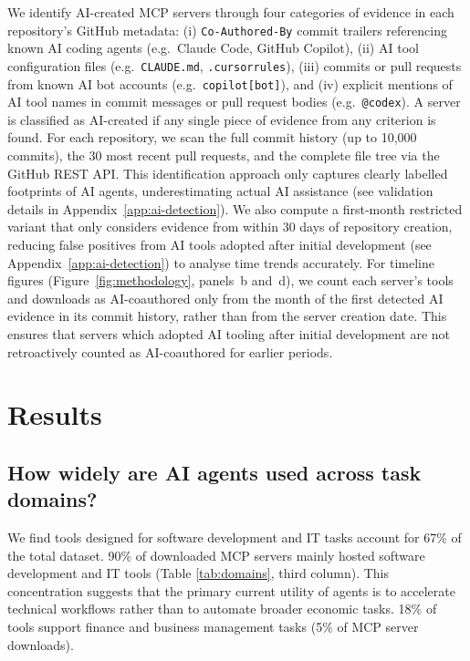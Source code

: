 \documentclass[manuscript,screen,nonacm,oneside]{acmart}
\begin{document}
We identify AI-created MCP servers through four categories of evidence in each repository's GitHub metadata: (i) \texttt{Co-Authored-By} commit trailers referencing known AI coding agents (e.g.\ Claude Code, GitHub Copilot), (ii) AI tool configuration files (e.g.\ \texttt{CLAUDE.md}, \texttt{.cursorrules}), (iii) commits or pull requests from known AI bot accounts (e.g.\ \texttt{copilot[bot]}), and (iv) explicit mentions of AI tool names in commit messages or pull request bodies (e.g.\ \texttt{@codex}). A server is classified as AI-created if any single piece of evidence from any criterion is found. For each repository, we scan the full commit history (up to 10,000 commits), the 30 most recent pull requests, and the complete file tree via the GitHub REST API. This identification approach only captures clearly labelled footprints of AI agents, underestimating actual AI assistance (see validation details in Appendix~\ref{app:ai-detection}). We also compute a first-month restricted variant that only considers evidence from within 30 days of repository creation, reducing false positives from AI tools adopted after initial development (see Appendix~\ref{app:ai-detection}) to analyse time trends accurately. For timeline figures (Figure~\ref{fig:methodology}, panels~b and~d), we count each server's tools and downloads as AI-coauthored only from the month of the first detected AI evidence in its commit history, rather than from the server creation date. This ensures that servers which adopted AI tooling after initial development are not retroactively counted as AI-coauthored for earlier periods.

\section{Results}
\label{sec:results}
\subsection{How widely are AI agents used across task domains?}
\label{sec:res-task-domains}

We find tools designed for software development and IT tasks account for 67\% of the total dataset. 90\% of downloaded MCP servers mainly hosted software development and IT tools (Table \ref{tab:domains}, third column). This concentration suggests that the primary current utility of agents is to accelerate technical workflows rather than to automate broader economic tasks. 18\% of tools support finance and business management tasks (5\% of MCP server downloads).
\end{document}
